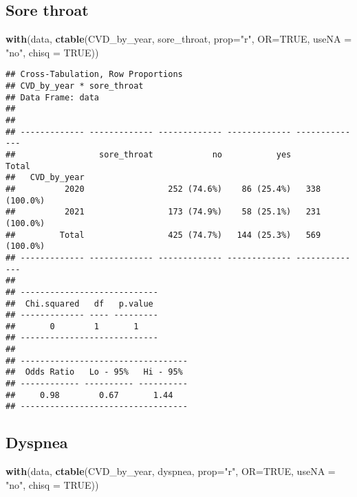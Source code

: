\documentclass[
]{article}
\newenvironment{Shaded}{\begin{snugshade}}{\end{snugshade}}
\newcommand{\AttributeTok}[1]{\textcolor[rgb]{0.13,0.29,0.53}{#1}}
\newcommand{\ConstantTok}[1]{\textcolor[rgb]{0.56,0.35,0.01}{#1}}
\newcommand{\FunctionTok}[1]{\textcolor[rgb]{0.13,0.29,0.53}{\textbf{#1}}}
\newcommand{\NormalTok}[1]{#1}
\newcommand{\StringTok}[1]{\textcolor[rgb]{0.31,0.60,0.02}{#1}}
\begin{document}
\hypertarget{sore-throat}{%
\subsection{Sore throat}\label{sore-throat}}

\begin{Shaded}
\begin{Highlighting}[]
\FunctionTok{with}\NormalTok{(data, }\FunctionTok{ctable}\NormalTok{(CVD\_by\_year, sore\_throat, }\AttributeTok{prop=}\StringTok{"r"}\NormalTok{, }\AttributeTok{OR=}\ConstantTok{TRUE}\NormalTok{, }\AttributeTok{useNA =} \StringTok{"no"}\NormalTok{, }\AttributeTok{chisq =} \ConstantTok{TRUE}\NormalTok{))}
\end{Highlighting}
\end{Shaded}

\begin{verbatim}
## Cross-Tabulation, Row Proportions  
## CVD_by_year * sore_throat  
## Data Frame: data  
## 
## 
## ------------- ------------- ------------- ------------- --------------
##                 sore_throat            no           yes          Total
##   CVD_by_year                                                         
##          2020                 252 (74.6%)    86 (25.4%)   338 (100.0%)
##          2021                 173 (74.9%)    58 (25.1%)   231 (100.0%)
##         Total                 425 (74.7%)   144 (25.3%)   569 (100.0%)
## ------------- ------------- ------------- ------------- --------------
## 
## ----------------------------
##  Chi.squared   df   p.value 
## ------------- ---- ---------
##       0        1       1    
## ----------------------------
## 
## ----------------------------------
##  Odds Ratio   Lo - 95%   Hi - 95% 
## ------------ ---------- ----------
##     0.98        0.67       1.44   
## ----------------------------------
\end{verbatim}

\hypertarget{dyspnea}{%
\subsection{Dyspnea}\label{dyspnea}}

\begin{Shaded}
\begin{Highlighting}[]
\FunctionTok{with}\NormalTok{(data, }\FunctionTok{ctable}\NormalTok{(CVD\_by\_year, dyspnea, }\AttributeTok{prop=}\StringTok{"r"}\NormalTok{, }\AttributeTok{OR=}\ConstantTok{TRUE}\NormalTok{, }\AttributeTok{useNA =} \StringTok{"no"}\NormalTok{, }\AttributeTok{chisq =} \ConstantTok{TRUE}\NormalTok{))}
\end{Highlighting}
\end{Shaded}
\end{document}
